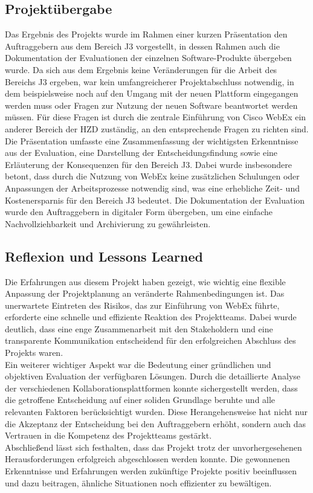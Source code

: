 \documentclass[ThesisDJ.tex]{subfiles}
\begin{document}
	\subsection{Projektübergabe}
	Das Ergebnis des Projekts wurde im Rahmen einer kurzen Präsentation den Auftraggebern aus dem Bereich J3 vorgestellt, in dessen Rahmen auch die Dokumentation der Evaluationen der einzelnen Software-Produkte übergeben wurde. Da sich aus dem Ergebnis keine Veränderungen für die Arbeit des Bereichs J3 ergeben, war kein umfangreicherer Projektabschluss notwendig, in dem beispielsweise noch auf den Umgang mit der neuen Plattform eingegangen werden muss oder Fragen zur Nutzung der neuen Software beantwortet werden müssen. Für diese Fragen ist durch die zentrale Einführung von Cisco WebEx ein anderer Bereich der HZD zuständig, an den entsprechende Fragen zu richten sind. \\
	Die Präsentation umfasste eine Zusammenfassung der wichtigsten Erkenntnisse aus der Evaluation, eine Darstellung der Entscheidungsfindung sowie eine Erläuterung der Konsequenzen für den Bereich J3. Dabei wurde insbesondere betont, dass durch die Nutzung von WebEx keine zusätzlichen Schulungen oder Anpassungen der Arbeitsprozesse notwendig sind, was eine erhebliche Zeit- und Kostenersparnis für den Bereich J3 bedeutet. Die Dokumentation der Evaluation wurde den Auftraggebern in digitaler Form übergeben, um eine einfache Nachvollziehbarkeit und Archivierung zu gewährleisten. \\
	
	\subsection{Reflexion und Lessons Learned}
	Die Erfahrungen aus diesem Projekt haben gezeigt, wie wichtig eine flexible Anpassung der Projektplanung an veränderte Rahmenbedingungen ist. Das unerwartete Eintreten des Risikos, das zur Einführung von WebEx führte, erforderte eine schnelle und effiziente Reaktion des Projektteams. Dabei wurde deutlich, dass eine enge Zusammenarbeit mit den Stakeholdern und eine transparente Kommunikation entscheidend für den erfolgreichen Abschluss des Projekts waren. \\
	Ein weiterer wichtiger Aspekt war die Bedeutung einer gründlichen und objektiven Evaluation der verfügbaren Lösungen. Durch die detaillierte Analyse der verschiedenen Kollaborationsplattformen konnte sichergestellt werden, dass die getroffene Entscheidung auf einer soliden Grundlage beruhte und alle relevanten Faktoren berücksichtigt wurden. Diese Herangehensweise hat nicht nur die Akzeptanz der Entscheidung bei den Auftraggebern erhöht, sondern auch das Vertrauen in die Kompetenz des Projektteams gestärkt. \\
	Abschließend lässt sich festhalten, dass das Projekt trotz der unvorhergesehenen Herausforderungen erfolgreich abgeschlossen werden konnte. Die gewonnenen Erkenntnisse und Erfahrungen werden zukünftige Projekte positiv beeinflussen und dazu beitragen, ähnliche Situationen noch effizienter zu bewältigen.
\end{document}
